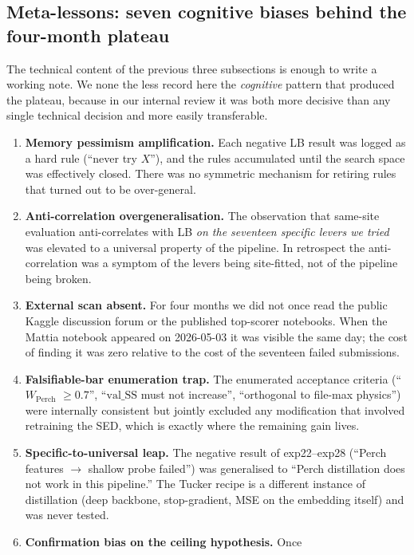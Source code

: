 \subsection{Meta-lessons: seven cognitive biases behind the four-month plateau}
\label{sec:meta-lessons}

The technical content of the previous three subsections is enough
to write a working note. We none the less record here the
\emph{cognitive} pattern that produced the plateau, because in our
internal review it was both more decisive than any single
technical decision and more easily transferable.

\begin{enumerate}
\item \textbf{Memory pessimism amplification.} Each negative LB
result was logged as a hard rule (``never try $X$''), and the
rules accumulated until the search space was effectively closed.
There was no symmetric mechanism for retiring rules that turned
out to be over-general.
\item \textbf{Anti-correlation overgeneralisation.} The
observation that same-site evaluation anti-correlates with LB
\emph{on the seventeen specific levers we tried} was elevated to
a universal property of the pipeline. In retrospect the
anti-correlation was a symptom of the levers being site-fitted,
not of the pipeline being broken.
\item \textbf{External scan absent.} For four months we did not
once read the public Kaggle discussion forum or the published
top-scorer notebooks. When the Mattia notebook appeared on
2026-05-03 it was visible the same day; the cost of finding it
was zero relative to the cost of the seventeen failed
submissions.
\item \textbf{Falsifiable-bar enumeration trap.} The enumerated
acceptance criteria (``$W_{\text{Perch}}$ $\ge 0.7$'', ``$\text{val\_SS}$
must not increase'', ``orthogonal to file-max physics'') were
internally consistent but jointly excluded any modification that
involved retraining the SED, which is exactly where the
remaining gain lives.
\item \textbf{Specific-to-universal leap.} The negative result of
exp22--exp28 (``Perch features $\to$ shallow probe failed'')
was generalised to ``Perch distillation does not work in this
pipeline.'' The Tucker recipe is a different instance of
distillation (deep backbone, stop-gradient, MSE on the embedding
itself) and was never tested.
\item \textbf{Confirmation bias on the ceiling hypothesis.} Once

\end{enumerate}
